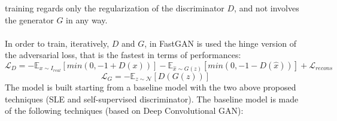 \documentclass[12pt]{article}
\begin{document}
training regards only the regularization of the discriminator $D$, and not involves the generator $G$ in any way.\\\\
In order to train, iteratively, $D$ and $G$, in FastGAN is used the hinge version of the adversarial loss, that is the fastest in terms
of performances:
\begin{equation}
	\mathcal{L}_D = - \mathbb{E}_{x \sim I_{real}}[min(0, -1 + D(x))] - \mathbb{E}_{\hat{x} \sim G(z)}[min(0,-1 - D(\hat{x}))] + \mathcal{L}_{recons}
\end{equation}
\begin{equation}
	\mathcal{L}_G = - \mathbb{E}_{z \sim \mathcal{N}}[D(G(z))]
\end{equation}
The model is built starting from a baseline model with the two above proposed techniques (SLE and self-supervised discriminator).
The baseline model is made of the following techniques (based on Deep Convolutional GAN):
\end{document}
